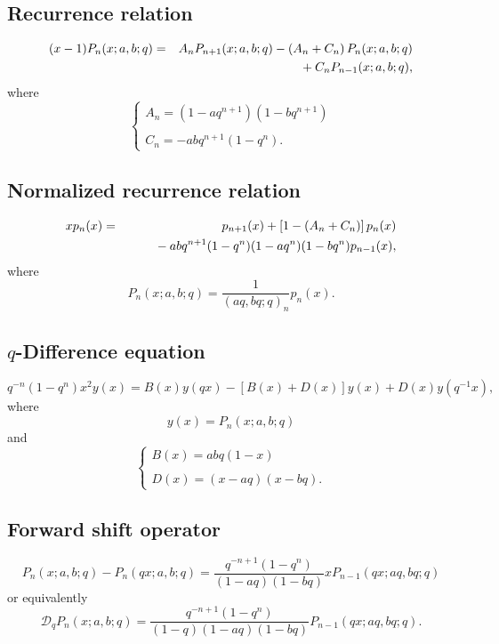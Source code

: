 \documentclass[envcountchap,graybox]{svmono}
\newcommand{\mathindent}{\hspace{7.5mm}}
\begin{document}
\subsection*{Recurrence relation}
\begin{eqnarray}
\label{RecBigqLaguerre}
(x-1)P_n(x;a,b;q)&=&A_nP_{n+1}(x;a,b;q)-\left(A_n+C_n\right)P_n(x;a,b;q)\nonumber\\
& &{}\mathindent{}+C_nP_{n-1}(x;a,b;q),
\end{eqnarray}
where
$$\left\{\begin{array}{l}
\displaystyle A_n=(1-aq^{n+1})(1-bq^{n+1})\\
\\
\displaystyle C_n=-abq^{n+1}(1-q^n).\end{array}\right.$$

\subsection*{Normalized recurrence relation}
\begin{eqnarray}
\label{NormRecBigqLaguerre}
xp_n(x)&=&p_{n+1}(x)+\left[1-(A_n+C_n)\right]p_n(x)\nonumber\\
& &{}\mathindent{}-abq^{n+1}(1-q^n)(1-aq^n)(1-bq^n)p_{n-1}(x),
\end{eqnarray}
where
$$P_n(x;a,b;q)=\frac{1}{(aq,bq;q)_n}p_n(x).$$

\subsection*{$q$-Difference equation}
\begin{equation}
\label{dvBigqLaguerre}
q^{-n}(1-q^n)x^2y(x)=B(x)y(qx)-\left[B(x)+D(x)\right]y(x)+D(x)y(q^{-1}x),
\end{equation}
where
$$y(x)=P_n(x;a,b;q)$$
and
$$\left\{\begin{array}{l}\displaystyle B(x)=abq(1-x)\\
\\
\displaystyle D(x)=(x-aq)(x-bq).\end{array}\right.$$

\subsection*{Forward shift operator}
\begin{equation}
\label{shift1BigqLaguerreI}
P_n(x;a,b;q)-P_n(qx;a,b;q)=\frac{q^{-n+1}(1-q^n)}
{(1-aq)(1-bq)}xP_{n-1}(qx;aq,bq;q)
\end{equation}
or equivalently
\begin{equation}
\label{shift1BigqLaguerreII}
\mathcal{D}_qP_n(x;a,b;q)=\frac{q^{-n+1}(1-q^n)}
{(1-q)(1-aq)(1-bq)}P_{n-1}(qx;aq,bq;q).
\end{equation}
\end{document}
